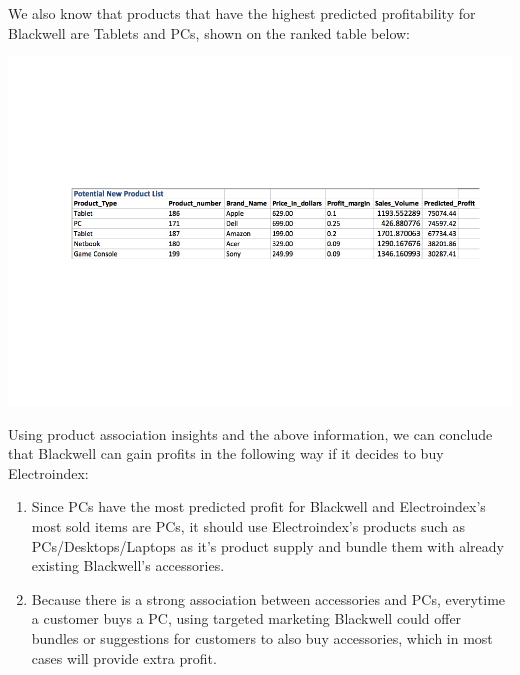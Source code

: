 \documentclass[]{article}
\begin{document}
We also know that products that have the highest predicted profitability
for Blackwell are Tablets and PCs, shown on the ranked table below:

\includegraphics{markdown_report_files/figure-latex/pic2-1.pdf}

Using product association insights and the above information, we can
conclude that Blackwell can gain profits in the following way if it
decides to buy Electroindex:

\begin{enumerate}
\def\labelenumi{\arabic{enumi})}
\item
  Since PCs have the most predicted profit for Blackwell and
  Electroindex's most sold items are PCs, it should use Electroindex's
  products such as PCs/Desktops/Laptops as it's product supply and
  bundle them with already existing Blackwell's accessories.
\item
  Because there is a strong association between accessories and PCs,
  everytime a customer buys a PC, using targeted marketing Blackwell
  could offer bundles or suggestions for customers to also buy
  accessories, which in most cases will provide extra profit.
\end{enumerate}
\end{document}
